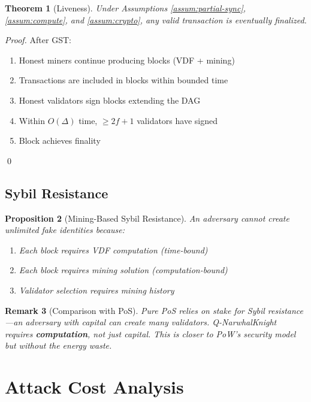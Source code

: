 \documentclass[11pt,a4paper]{article}
\newtheorem{theorem}{Theorem}[section]
\newtheorem{proposition}[theorem]{Proposition}
\newtheorem{remark}[theorem]{Remark}
\begin{document}
\begin{theorem}[Liveness]
\label{thm:liveness}
Under Assumptions \ref{assum:partial-sync}, \ref{assum:compute}, and \ref{assum:crypto}, any valid transaction is eventually finalized.
\end{theorem}

\begin{proof}
After GST:
\begin{enumerate}
    \item Honest miners continue producing blocks (VDF + mining)
    \item Transactions are included in blocks within bounded time
    \item Honest validators sign blocks extending the DAG
    \item Within $O(\Delta)$ time, $\geq 2f+1$ validators have signed
    \item Block achieves finality
\end{enumerate}
\qed
\end{proof}

\subsection{Sybil Resistance}

\begin{proposition}[Mining-Based Sybil Resistance]
An adversary cannot create unlimited fake identities because:
\begin{enumerate}
    \item Each block requires VDF computation (time-bound)
    \item Each block requires mining solution (computation-bound)
    \item Validator selection requires mining history
\end{enumerate}
\end{proposition}

\begin{remark}[Comparison with PoS]
Pure PoS relies on stake for Sybil resistance---an adversary with capital can create many validators. Q-NarwhalKnight requires \textbf{computation}, not just capital. This is closer to PoW's security model but without the energy waste.
\end{remark}

\section{Attack Cost Analysis}
\end{document}
